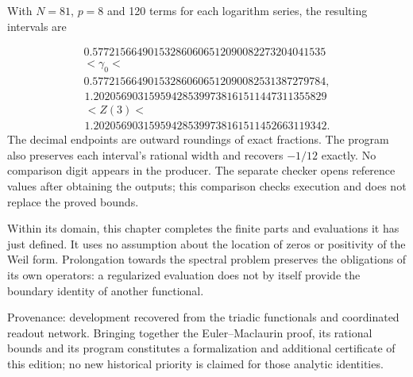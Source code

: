 With \(N=81\), \(p=8\) and 120 terms for each logarithm series, the resulting intervals are

\[
\begin{gathered}
0.577215664901532860606512090082273204041535\\
<\gamma_0<\\
0.577215664901532860606512090082531387279784,
\end{gathered}
\]
\[
\begin{gathered}
1.202056903159594285399738161511447311355829\\
<Z(3)<\\
1.202056903159594285399738161511452663119342.
\end{gathered}
\]
The decimal endpoints are outward roundings of exact fractions. The program also preserves each interval's rational width and recovers \(-1/12\) exactly. No comparison digit appears in the producer. The separate checker opens reference values after obtaining the outputs; this comparison checks execution and does not replace the proved bounds.

Within its domain, this chapter completes the finite parts and evaluations it has just defined. It uses no assumption about the location of zeros or positivity of the Weil form. Prolongation towards the spectral problem preserves the obligations of its own operators: a regularized evaluation does not by itself provide the boundary identity of another functional.

Provenance: development recovered from the triadic functionals and coordinated readout network. Bringing together the Euler–Maclaurin proof, its rational bounds and its program constitutes a formalization and additional certificate of this edition; no new historical priority is claimed for those analytic identities.
